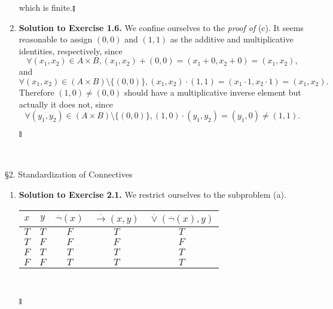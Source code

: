 \begin{enumerate}[1.]
\[\]
which is finite.\nolinebreak\hfill$\talloblong$
%
\item \textbf{Solution to Exercise 1.6.}
We confine ourselves to the \textit{proof of} (c). It seems reasonable to assign $(0,0)$ and $(1,1)$ as the additive and multiplicative identities, respectively, since
\[
\forall (x_1, x_2) \in A \times B, (x_1, x_2) + (0, 0) = (x_1 + 0, x_2 + 0) = (x_1, x_2),
\]
and
\[
\forall (x_1, x_2) \in (A \times B) \setminus \{ (0,0) \}, (x_1, x_2) \cdot (1, 1) = (x_1 \cdot 1, x_2 \cdot 1) = (x_1, x_2).
\]
Therefore $(1,0) \not = (0,0)$ should have a multiplicative inverse element but actually it does not, since
\[
\forall (y_1, y_2) \in (A \times B) \setminus \{ (0,0) \}, (1,0) \cdot (y_1, y_2) = (y_1, 0) \neq (1,1).
\]
\begin{flushright}$\talloblong$\end{flushright}
\end{enumerate}
\ 
\\
\\
{\large \S2. Standardization of Connectives}
\begin{enumerate}[1.]
\item \textbf{Solution to Exercise 2.1.} We restrict ourselves to the subproblem (a).
\begin{tabular}{cc|c|c|c}
$x$ & $y$ & $\stackrel{.}{\neg}(x)$ & $\stackrel{.}{\rightarrow}(x, y)$ & $\stackrel{.}{\lor}(\stackrel{.}{\neg}(x), y)$ \\ \hline
$T$ & $T$ & $F$ & $T$ & $T$ \\
$T$ & $F$ & $F$ & $F$ & $F$ \\
$F$ & $T$ & $T$ & $T$ & $T$ \\
$F$ & $F$ & $T$ & $T$ & $T$
\end{tabular}
\ 
\\\begin{flushright}$\talloblong$\end{flushright}
\end{enumerate}
